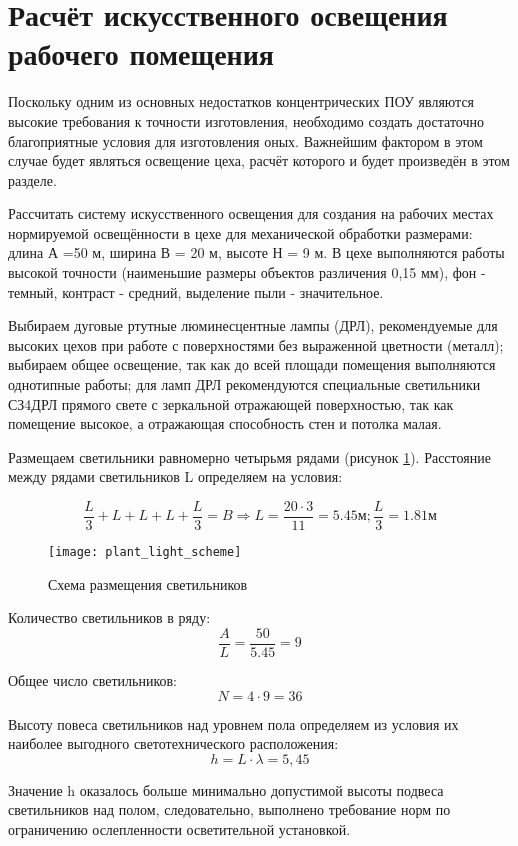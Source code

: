\section{Расчёт искусственного освещения \\рабочего помещения}
Поскольку одним из основных недостатков концентрических ПОУ являются высокие требования к точности изготовления, необходимо создать достаточно благоприятные условия для изготовления оных. Важнейшим фактором в этом случае будет являться освещение цеха, расчёт которого и будет произведён в этом разделе.

Рассчитать систему искусственного освещения для создания на рабочих местах нормируемой освещённости в цехе для механической обработки размерами: длина А =50 м, ширина В = 20 м, высоте Н = 9 м. В цехе выполняются работы высокой точности (наименьшие размеры объектов различения 0,15 мм), фон - темный, контраст - средний, выделение пыли -  значительное. 

Выбираем дуговые ртутные люминесцентные лампы (ДРЛ), рекомендуемые для высоких цехов при работе с поверхностями без выраженной цветности (металл); выбираем общее освещение, так как до всей площади помещения выполняются однотипные работы; для ламп ДРЛ рекомендуются специальные светильники СЗ4ДРЛ прямого свете с зеркальной отражающей поверхностью, так как помещение высокое, а отражающая способность стен и потолка малая. 

Размещаем светильники равномерно четырьмя рядами (рисунок \ref{fig:plant_light_scheme}). Расстояние между рядами светильников L определяем на условия:

$$ \frac{L}{3} + L + L + L + \frac{L}{3} = B \Rightarrow L = \frac{20 \cdot 3}{11}=5.45 м; \frac{L}{3} = 1.81 м $$

\begin{figure}[!h]
\begin{center}
	\texttt{[image: plant\_light\_scheme]}
	\caption{Схема размещения светильников}
	\label{fig:plant_light_scheme}
\end{center}
\end{figure}

Количество светильников в ряду:
$$ \frac{A}{L} = \frac{50}{5.45} = 9 $$

Общее число светильников:
$$ N = 4 \cdot 9 = 36 $$

Высоту повеса светильников над уровнем пола определяем из условия их наиболее выгодного светотехнического расположения:
$$ h =L \cdot \lambda=5,45 $$

Значение h оказалось больше минимально допустимой высоты подвеса светильников над полом, следовательно, выполнено требование норм по ограничению ослепленности осветительной установкой. 

